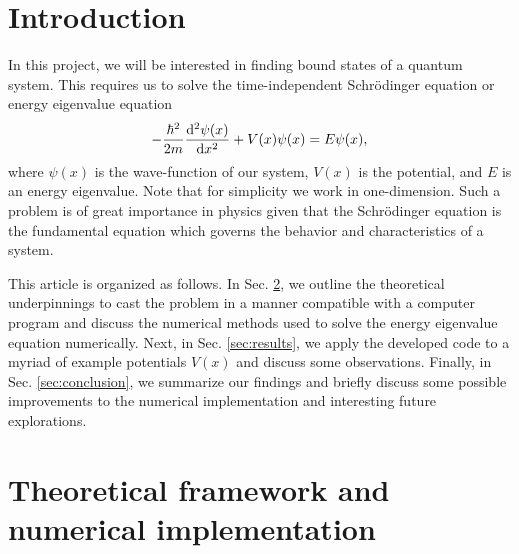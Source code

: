 
\def\HWnum{Project 3}
\def\duedate{November 10, 2024}




\section{Introduction}
\label{sec:introduction}

In this project, we will be interested in finding bound states of a quantum system.
This requires us to solve the time-independent Schr\"{o}dinger equation or energy eigenvalue equation
\begin{align}
    -\frac{\hbar^2}{2m} \dv[2]{\psi(x)}{x} + V(x) \psi(x) = E \psi(x)
,\end{align}
where $\psi(x)$ is the wave-function of our system, $V(x)$ is the potential, and $E$ is an energy eigenvalue.
Note that for simplicity we work in one-dimension.
Such a problem is of great importance in physics given that the Schr\"{o}dinger equation is the fundamental equation which governs the behavior and characteristics of a system.

This article is organized as follows.
In Sec. \ref{sec:theoretical-framework-and-numerical-implementation}, we outline the theoretical underpinnings to cast the problem in a manner compatible with a computer program and discuss the numerical methods used to solve the energy eigenvalue equation numerically.
Next, in Sec. \ref{sec:results}, we apply the developed code to a myriad of example potentials $V(x)$ and discuss some observations.
Finally, in Sec. \ref{sec:conclusion}, we summarize our findings and briefly discuss some possible improvements to the numerical implementation and interesting future explorations.


\section{Theoretical framework and numerical implementation}
\label{sec:theoretical-framework-and-numerical-implementation}

